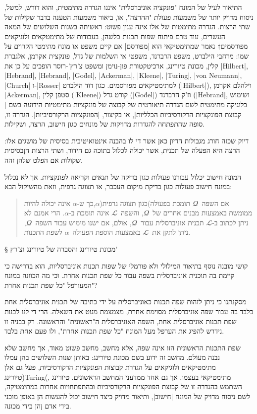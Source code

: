 התיאור לעיל של המונח "פונקציה אוניברסלית" איננו הגדרה מתימטית, והוא דורש, למשל,
ניסוח מדויק יותר של משמעות פעולת "ההרצה", או, ביאור משמעות הטענה בדבר שקילות
של שתי הרצות. הגדרה מתימטית של אלו אינה ענין פשוט: ראשיתה בשנות השלושים של
המאה העשרים, עוד טרם פיתוח שפות תכנות כלשהן, בעבודות של מתימטקאים ולוגיקאים
מפורסמים†{%
  נאמר שמתימטיקאי הוא \ע|מפורסם| אם קיים משפט או מונח מתימטי הקרוים על שמו:
  מרחבי הילברט, משפט הרברנד, משפטי אי השלמות של גדל, פונקצית אקרמן, אלגברת
  קלין, מכונת טיורינג, ארכיטקטורת פון-נוימן ומשפט צ'רץ'-רוסר הופכים על כן את
  \E|Hilbert|, \E|Hebrand|, \E|Hebrand|, \E|Go\"del|, \E|Ackerman|, \E|Kleene|,
  \E|Turing|, \E|von Neumann|, \E|Church| ו-\E|Rosser| למתימטיקאים מפורסמים.
} כגון דוד הילברט (\E|Hilbert|), וילהלם אקרמן \E|Ackerman|, סטפן קלין
(\E|Kleene|) קורט גדל (\E|Go\"del|) וז'ק הרברנד (\E|Hebrand|, ושימוש בלוגיקה
מתימטית לשם הגדרה תיאורטית של קבוצה של פונקציות מתימטיות הידועה בשם \ע|קבוצת
הפונקציות הרקורסיביות הכלליות|, או בקיצור, \ע|הפונקציות הרקורסיביות|. הגדרה זו,
סופה שהתפתחה להגדרות מדויקות של מונחים כגון חישוב, הרצה, ושקילות.

דיוק שכזה חורג מגבולות הדיון כאן אשר די לו בהבנה אינטואיטיבית בסיסית של מושגים
אלו: הרצה היא הפעלה של תכנית, אשר יכולה לכלול בתוכה גם הידור, ושתי הרצות
הןבסיסית שקולות אם הפלט שלהן זהה.

המונח חישוב יכלול עבורנו פעולות כגון בדיקה של תנאים וקריאה לפונקציות. אך לא
נכלול במונח חישוב פעולות כגון בדיקת מיקום העכבר, או תצוגה גרפית, וזאת מהשיקול
הבא:
\begin{quote}
  אם השפה~$𝓠$ תומכת בפעולה)כגון תצוגה גרפית($α$,כך ש-$α$ אינה יכולה להיות
  ממומשת באמצעות מבנים אחרים של~$𝓠$, והשפה~$𝓛$ אינה תומכת ב-$α$. הרי אמנם לא
  ניתן לכתוב ב-$𝓛$ תכנית אוניברסלית עבור~$𝓠$, אולם, אם ישנו מימוש עבור
  השפה~$𝓠$, ניתן לתקן את~$𝓛$ באמצעות הוספת הפעולה~$α$ לשפת התכנות.
\end{quote}

§ מכונת טיורינג והסברה של טיורינג וצ'רץ'

קושי מובנה נוסף בתיאור המילולי ולא פורמלי של שפות תכנות אוניברסליות, הוא בדרישה
כי קיימת בה תוכנית אוניברסלית בשפה עבור כל שפת תכנות אחרת. וכי מה הכוונה במונח
המעורפל "כל שפת תכנות אחרת"?

מסקנתנו כי ניתן לזהות שפה תכנות כאוניברסלית על ידי כתיבה של תכנית אוניברסלית
אחת בלבד בה עבור שפה אוניברסלית מסוימת אחרת, מצמצמת מעט את השאלה. הרי די לנו
לבנות שפת תכנות אוניברסלית אחת, השפה האוניברסלית ה"ראשונית" והראשונה. רק בבניה
זו נידרש להפיג את הערפל מעל המונח "כל שפת תכנות אחרת", ולו פעם אחת בלבד.

שפת התכנות הראשונית הזו אינה שפה, אלא מחשב, מחשב פשוט מאוד, אך מחשב שלא נבנה
מעולם. מחשב זה ידוע בשם מכונת טיורינג: באותן שנות השלושים בהן עמלו מתימטיקאים
ולוגיקאים על הגדרת קבוצות הפונקציות הרקורסיביות, פעל גם אלן טיורינג)Turing(,
מתימטיקאי בעצמו, אך גם אחד ממדעני המחשב הראשונים. טיורינג השתמש בהגדרה זו של
קבוצת הפונקציות הרקורסיביות ובהתפתחויות אחרות במתימטיקה, לשם ניסוח מדויק של
המונח \ע|חישוב|, ותיאור מדויק כיצד חישוב יכול להעשות הן באופן מוכני בידי אדם
ןהן בידי מכונה.

